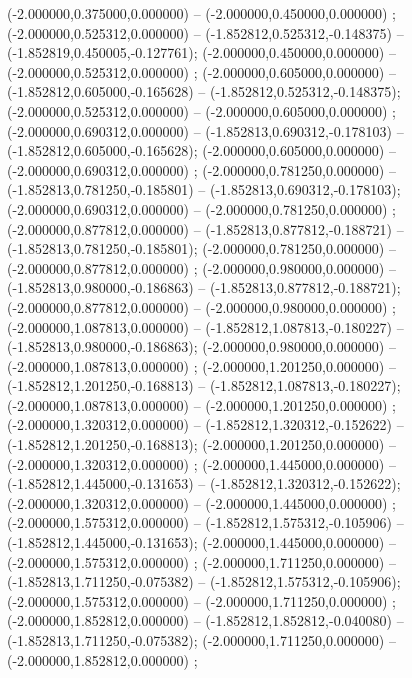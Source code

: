  (-2.000000,0.375000,0.000000) -- (-2.000000,0.450000,0.000000) ;
 (-2.000000,0.525312,0.000000) -- (-1.852812,0.525312,-0.148375) -- (-1.852819,0.450005,-0.127761);
 (-2.000000,0.450000,0.000000) -- (-2.000000,0.525312,0.000000) ;
 (-2.000000,0.605000,0.000000) -- (-1.852812,0.605000,-0.165628) -- (-1.852812,0.525312,-0.148375);
 (-2.000000,0.525312,0.000000) -- (-2.000000,0.605000,0.000000) ;
 (-2.000000,0.690312,0.000000) -- (-1.852813,0.690312,-0.178103) -- (-1.852812,0.605000,-0.165628);
 (-2.000000,0.605000,0.000000) -- (-2.000000,0.690312,0.000000) ;
 (-2.000000,0.781250,0.000000) -- (-1.852813,0.781250,-0.185801) -- (-1.852813,0.690312,-0.178103);
 (-2.000000,0.690312,0.000000) -- (-2.000000,0.781250,0.000000) ;
 (-2.000000,0.877812,0.000000) -- (-1.852813,0.877812,-0.188721) -- (-1.852813,0.781250,-0.185801);
 (-2.000000,0.781250,0.000000) -- (-2.000000,0.877812,0.000000) ;
 (-2.000000,0.980000,0.000000) -- (-1.852813,0.980000,-0.186863) -- (-1.852813,0.877812,-0.188721);
 (-2.000000,0.877812,0.000000) -- (-2.000000,0.980000,0.000000) ;
 (-2.000000,1.087813,0.000000) -- (-1.852812,1.087813,-0.180227) -- (-1.852813,0.980000,-0.186863);
 (-2.000000,0.980000,0.000000) -- (-2.000000,1.087813,0.000000) ;
 (-2.000000,1.201250,0.000000) -- (-1.852812,1.201250,-0.168813) -- (-1.852812,1.087813,-0.180227);
 (-2.000000,1.087813,0.000000) -- (-2.000000,1.201250,0.000000) ;
 (-2.000000,1.320312,0.000000) -- (-1.852812,1.320312,-0.152622) -- (-1.852812,1.201250,-0.168813);
 (-2.000000,1.201250,0.000000) -- (-2.000000,1.320312,0.000000) ;
 (-2.000000,1.445000,0.000000) -- (-1.852812,1.445000,-0.131653) -- (-1.852812,1.320312,-0.152622);
 (-2.000000,1.320312,0.000000) -- (-2.000000,1.445000,0.000000) ;
 (-2.000000,1.575312,0.000000) -- (-1.852812,1.575312,-0.105906) -- (-1.852812,1.445000,-0.131653);
 (-2.000000,1.445000,0.000000) -- (-2.000000,1.575312,0.000000) ;
 (-2.000000,1.711250,0.000000) -- (-1.852813,1.711250,-0.075382) -- (-1.852812,1.575312,-0.105906);
 (-2.000000,1.575312,0.000000) -- (-2.000000,1.711250,0.000000) ;
 (-2.000000,1.852812,0.000000) -- (-1.852812,1.852812,-0.040080) -- (-1.852813,1.711250,-0.075382);
 (-2.000000,1.711250,0.000000) -- (-2.000000,1.852812,0.000000) ;

